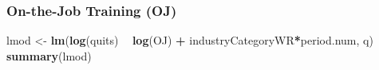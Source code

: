 \documentclass[
]{article}
\newenvironment{Shaded}{\begin{snugshade}}{\end{snugshade}}
\newcommand{\KeywordTok}[1]{\textcolor[rgb]{0.13,0.29,0.53}{\textbf{#1}}}
\newcommand{\NormalTok}[1]{#1}
\newcommand{\OperatorTok}[1]{\textcolor[rgb]{0.81,0.36,0.00}{\textbf{#1}}}
\newcommand{\StringTok}[1]{\textcolor[rgb]{0.31,0.60,0.02}{#1}}
\begin{document}
\hypertarget{on-the-job-training-oj-2}{%
\subsubsection{On-the-Job Training
(OJ)}\label{on-the-job-training-oj-2}}

\begin{Shaded}
\begin{Highlighting}[]
\NormalTok{lmod <-}\StringTok{ }\KeywordTok{lm}\NormalTok{(}\KeywordTok{log}\NormalTok{(quits) }\OperatorTok{~}\StringTok{ }\KeywordTok{log}\NormalTok{(OJ) }\OperatorTok{+}\StringTok{ }\NormalTok{industryCategoryWR}\OperatorTok{*}\NormalTok{period.num, q)}
\KeywordTok{summary}\NormalTok{(lmod)}
\end{Highlighting}
\end{Shaded}
\end{document}
